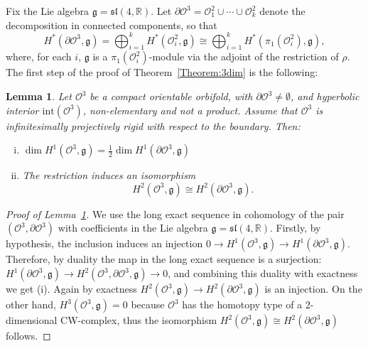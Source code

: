 \documentclass[a4paper,11pt]{article}
\newtheorem{Proposition}[Theorem]{Proposition}
\newtheorem{Lemma}[Theorem]{Lemma}
\begin{document}
% 
% 




Fix the Lie algebra $\mathfrak g= \mathfrak{sl}(4,
\mathbb R)$.
Let $\partial \mathcal O^3= \mathcal O^2_1\cup \cdots \cup  \mathcal O^2_k$ denote the decomposition in 
connected components, so that 
$$
H^*(\partial \mathcal O^3,\mathfrak g)=\bigoplus_{i=1}^k H^*(  \mathcal O^2_i,\mathfrak g) \cong 
\bigoplus_{i=1}^k H^*(\pi_1(   \mathcal O^2_i),\mathfrak g),
$$
where, for each $i$, $\mathfrak g$ is a $\pi_1( \mathcal O^2_i)$-module via the adjoint of
the restriction of $\rho$. The first step of the proof of Theorem~\ref{Theorem:3dim} is the following:


\begin{Lemma}
\label{Lemma:resiso}
Let $\mathcal O^3$ be a compact orientable orbifold, with $\partial \mathcal O^3\neq \emptyset$, and hyperbolic interior
$\mathrm{int}( \mathcal O^3 )$, non-elementary and not a product.
Assume that $\mathcal O^3$ is infinitesimally projectively rigid 
with respect to the boundary. Then:
\begin{enumerate}[(i)]
 \item $\dim H^1(\mathcal O^3,\mathfrak g)=\frac12 \dim H^1(\partial\mathcal O^3,\mathfrak g)$
 \item The restriction induces an isomorphism 
\begin{equation}
\label{eqn:periph}
H^2(\mathcal O^3,\mathfrak g)\cong H^2(\partial\mathcal O^3,\mathfrak g).
 \end{equation}
\end{enumerate}
\end{Lemma} 
 
\begin{proof}[Proof of Lemma~\ref{Lemma:resiso}]
We use the long exact sequence in cohomology of the pair 
$(\mathcal O^3,\partial\mathcal O^3)$ with coefficients in the Lie algebra $\mathfrak g= \mathfrak{sl}(4,
\mathbb R)$. Firstly, by hypothesis, the inclusion induces an injection
$
0\to H^1(\mathcal O^3,\mathfrak{g}) \to 
H^1(\partial \mathcal O^3,\mathfrak{g})
$.
Therefore, by duality the map in the long exact sequence is a surjection:
$
H^1(\partial \mathcal O^3,\mathfrak{g}) \to 
H^2(\mathcal O^3,\partial \mathcal O^3,\mathfrak{g})\to 0
$,
and combining this duality with exactness we get (i).
Again by exactness
$
 H^2(\mathcal O^3,\mathfrak g)\to H^2(\partial\mathcal O^3,\mathfrak g)
$ is an injection.
On the other hand,   $H^3(\mathcal O^3,\mathfrak g)=0$ because $\mathcal O^3$ has 
the homotopy type of a 2-dimensional CW-complex, thus  the isomorphism
$H^2(\mathcal O^3,\mathfrak g)\cong H^2(\partial\mathcal O^3 , 
\mathfrak g)$
follows.
\end{proof}
\end{document}
